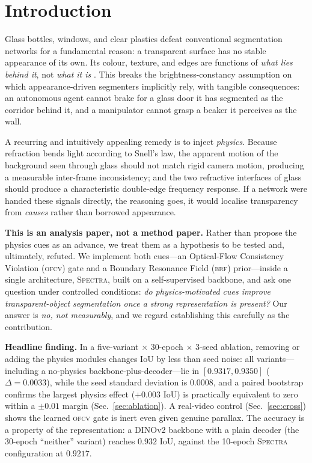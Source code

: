 \documentclass{bmvc2k}
\newcommand{\spectra}{\textsc{Spectra}}
\newcommand{\ofcv}{\textsc{ofcv}}
\newcommand{\brf}{\textsc{brf}}
\newcommand{\dinov}{DINOv2}
\newcommand{\iou}{IoU}
\begin{document}
\section{Introduction}
Glass bottles, windows, and clear plastics defeat conventional segmentation
networks for a fundamental reason: a transparent surface has no stable
appearance of its own. Its colour, texture, and edges are functions of
\emph{what lies behind it}, not \emph{what it is} \cite{xie2020translab}. This
breaks the brightness-constancy assumption on which appearance-driven segmenters
implicitly rely, with tangible consequences: an autonomous agent cannot brake
for a glass door it has segmented as the corridor behind it, and a manipulator
cannot grasp a beaker it perceives as the wall.

A recurring and intuitively appealing remedy is to inject \emph{physics}.
Because refraction bends light according to Snell's law, the apparent motion of
the background seen through glass should not match rigid camera motion,
producing a measurable inter-frame inconsistency; and the two refractive
interfaces of glass should produce a characteristic double-edge frequency
response. If a network were handed these signals directly, the reasoning goes,
it would localise transparency from \emph{causes} rather than borrowed
appearance.

\textbf{This is an analysis paper, not a method paper.} Rather than propose the
physics cues as an advance, we treat them as a hypothesis to be tested and,
ultimately, refuted. We implement both cues---an Optical-Flow Consistency
Violation (\ofcv) gate and a Boundary Resonance Field (\brf) prior---inside a
single architecture, \spectra, built on a self-supervised backbone, and ask one
question under controlled conditions: \emph{do physics-motivated cues improve
transparent-object segmentation once a strong representation is present?} Our
answer is \emph{no, not measurably}, and we regard establishing this carefully
as the contribution.

\textbf{Headline finding.} In a five-variant $\times$ 30-epoch $\times$ 3-seed
ablation, removing or adding the physics modules changes \iou{} by less than
seed noise: all variants---including a no-physics backbone-plus-decoder---lie in
$[0.9317,0.9350]$ ($\Delta=0.0033$), while the seed standard deviation is
$0.0008$, and a paired bootstrap confirms the largest physics effect
($+0.003$ \iou) is practically equivalent to zero within a $\pm0.01$ margin
(Sec.~\ref{sec:ablation}). A real-video control (Sec.~\ref{sec:cross})
shows the learned \ofcv{} gate is inert even given genuine parallax. The
accuracy is a property of the representation: a \dinov{} backbone with a plain
decoder (the 30-epoch ``neither'' variant) reaches $0.932$ \iou, against the
10-epoch \spectra{} configuration at $0.9217$.
\end{document}
